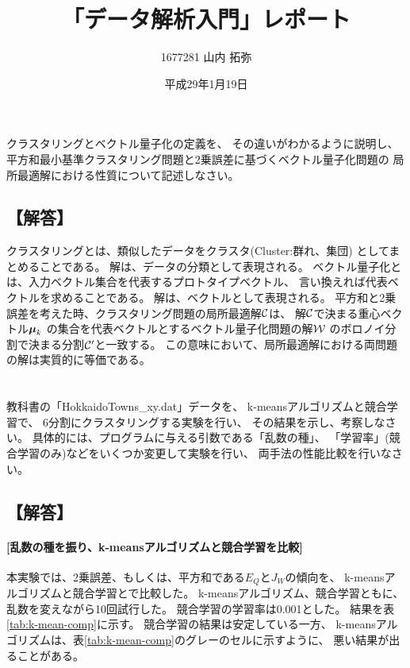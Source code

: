 \documentclass[a4j]{jarticle}
\title{「データ解析入門」レポート}
\author{1677281 山内 拓弥}
\date{平成29年1月19日}
\begin{document}
\maketitle

\section{}
クラスタリングとベクトル量子化の定義を、
その違いがわかるように説明し、
平方和最小基準クラスタリング問題と2乗誤差に基づくベクトル量子化問題の
局所最適解における性質について記述しなさい。

\subsection{【解答】}
クラスタリングとは、類似したデータをクラスタ(Cluster:群れ、集団)
としてまとめることである。
解は、データの分類として表現される。
ベクトル量子化とは、入力ベクトル集合を代表するプロトタイプベクトル、
言い換えれば代表ベクトルを求めることである。
解は、ベクトルとして表現される。
平方和と2乗誤差を考えた時、クラスタリング問題の局所最適解${\cal C}$は、
解${\cal C}$で決まる重心ベクトル$\mbox{\boldmath $\mu$}_k$
の集合を代表ベクトルとするベクトル量子化問題の解${\cal W}$
のボロノイ分割で決まる分割${\cal C'}$と一致する。
この意味において、局所最適解における両問題の解は実質的に等価である。

\section{}
教科書の「HokkaidoTowns\_xy\@.dat」データを、 k-meansアルゴリズムと競合学習で、
6分割にクラスタリングする実験を行い、 その結果を示し、考察しなさい。
具体的には、プログラムに与える引数である「乱数の種」、
「学習率」(競合学習のみ)などをいくつか変更して実験を行い、
両手法の性能比較を行いなさい。

\subsection{【解答】}

\paragraph{[乱数の種を振り、k-meansアルゴリズムと競合学習を比較]}
本実験では、2乗誤差、もしくは、平方和である$E_Q$と$J_W$の傾向を、
k-meansアルゴリズムと競合学習とで比較した。
k-meansアルゴリズム、競合学習ともに、乱数を変えながら10回試行した。
競合学習の学習率は0.001とした。
結果を表\ref{tab:k-mean-comp}に示す。
競合学習の結果は安定している一方、
k-meansアルゴリズムは、表\ref{tab:k-mean-comp}のグレーのセルに示すように、
悪い結果が出ることがある。
\end{document}

